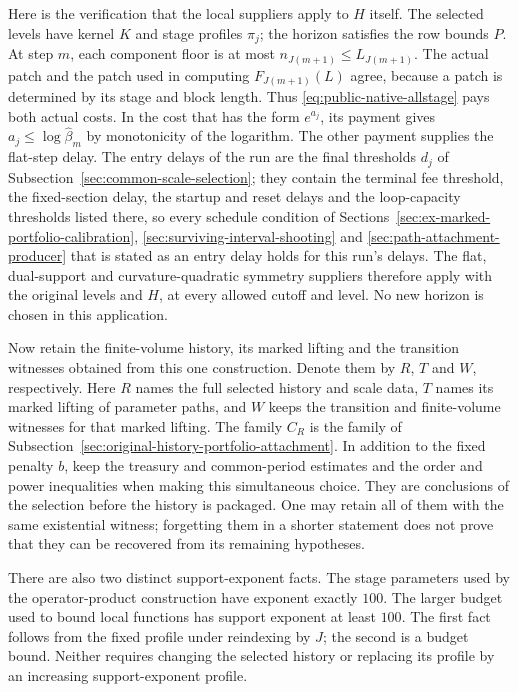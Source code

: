 Here is the verification that the local suppliers apply to $H$ itself.
The selected levels have kernel $K$ and stage profiles $\pi_j$; the
horizon satisfies the row bounds $P$. At step $m$, each component floor
is at most $n_{J(m+1)}\le L_{J(m+1)}$. The actual patch and the patch
used in computing $F_{J(m+1)}(L)$ agree, because a patch is determined
by its stage and block length. Thus \eqref{eq:public-native-allstage}
pays both actual costs. In the cost that has the form $e^{a_j}$, its
payment gives $a_j\le\log\widehat\beta_m$ by monotonicity of the
logarithm. The other payment supplies the flat-step delay. The entry delays of
the run are the final thresholds $d_j$ of
Subsection~\ref{sec:common-scale-selection}; they contain the terminal fee
threshold, the fixed-section delay, the startup and reset delays and
the loop-capacity thresholds listed there, so every schedule condition
of Sections~\ref{sec:ex-marked-portfolio-calibration},
\ref{sec:surviving-interval-shooting} and
\ref{sec:path-attachment-producer} that is stated as an entry delay
holds for this run's delays. The flat,
dual-support and curvature-quadratic symmetry suppliers therefore apply with the original
levels and $H$, at every allowed cutoff and level. No new horizon is
chosen in this application.

Now retain the finite-volume history, its marked lifting and the transition
witnesses obtained from this one construction. Denote them by
$R$, $T$ and $W$, respectively. Here $R$ names the full selected
history and scale data, $T$ names its marked lifting of parameter paths,
and $W$ keeps the transition and finite-volume witnesses for that
marked lifting. The family $C_R$ is the family of
Subsection~\ref{sec:original-history-portfolio-attachment}. In addition
to the fixed penalty $b$, keep the treasury and common-period estimates
and the order and power inequalities when making this simultaneous
choice. They are conclusions of the selection before the history is
packaged. One may retain all of them with the same existential witness;
forgetting them in a shorter statement does not prove that they can be
recovered from its remaining hypotheses.

There are also two distinct support-exponent facts. The stage
parameters used by the operator-product construction have exponent
exactly $100$. The larger budget used to bound local functions has
support exponent at least $100$. The first fact follows from the fixed
profile under reindexing by $J$; the second is a budget bound. Neither
requires changing the selected history or replacing its profile by an
increasing support-exponent profile.

